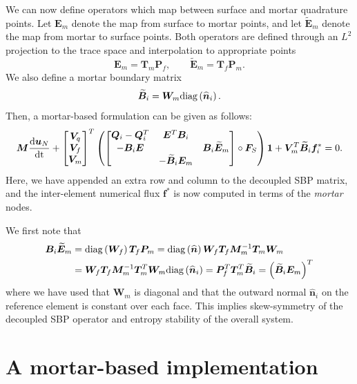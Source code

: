 \documentclass[review]{siamart0216}
\renewcommand{\tilde}{\widetilde}
\renewcommand{\hat}{\widehat}
\newcommand{\td}[2]{\frac{{\rm d}#1}{{\rm d}{\rm #2}}}
\newcommand{\LRp}[1]{\left( #1 \right)}
\newcommand{\note}[1]{{\color{blue}{#1}}}
\newcommand{\diag}[1]{{\rm diag}\LRp{#1}}
\begin{document}
We can now define operators which map between surface and mortar quadrature points.  Let $\bm{E}_m$ denote the map from surface to mortar points, and let $\tilde{\bm{E}}_m $ denote the map from mortar to surface points.  Both operators are defined through an $L^2$ projection to the trace space and interpolation to appropriate points
\[
\bm{E}_m = \bm{T}_m \bm{P}_f, \qquad \tilde{\bm{E}}_m = \bm{T}_f \bm{P}_m.
\]  
We also define a mortar boundary matrix
\[
\tilde{\bm{B}}_i = \bm{W}_m\diag{\hat{\bm{n}}_i}.
\]
Then, a mortar-based formulation can be given as follows:
\begin{equation}
\bm{M}\td{\bm{u}_N}{t} + \begin{bmatrix} \bm{V}_q \\ \bm{V}_f \\ \bm{V}_m \end{bmatrix}^T
\LRp{\begin{bmatrix}
\bm{Q}_i-\bm{Q}_i^T & \bm{E}^T\bm{B}_i &\\
-\bm{B}_i\bm{E} &  & \bm{B}_i\tilde{\bm{E}}_m \\
& -\tilde{\bm{B}}_i{\bm{E}}_m & 
\end{bmatrix} \circ \bm{F}_S}\bm{1} + \bm{V}_m^T\tilde{\bm{B}}_i\bm{f}_i^* = 0.  
\label{eq:mortar}
\end{equation}
Here, we have appended an extra row and column to the decoupled SBP matrix, and the inter-element numerical flux $\bm{f}^*$ is now computed in terms of the \emph{mortar} nodes.  

We first note that
\begin{align*}
\bm{B}_i\tilde{\bm{E}}_m &= \diag{\bm{W}_f} \bm{T}_f \bm{P}_m = \diag{\hat{\bm{n}}} \bm{W}_f \bm{T}_f \bm{M}_m^{-1}\bm{T}_m\bm{W}_m\\
&=  \bm{W}_f \bm{T}_f \bm{M}_m^{-1}\bm{T}^T_m\bm{W}_m\diag{\hat{\bm{n}}_i} = \bm{P}_f^T\bm{T}^T_m \tilde{\bm{B}}_i = \LRp{\tilde{\bm{B}}_i{\bm{E}}_m}^T
\end{align*}
where we have used that $\bm{W}_m$ is diagonal and that the outward normal $\hat{\bm{n}}_i$ on the reference element is constant over each face.  This implies skew-symmetry of the decoupled SBP operator and entropy stability of the overall system.    


\note{Finish}

\section{A mortar-based implementation}
\end{document}
